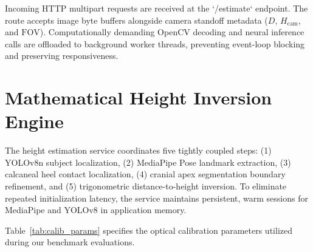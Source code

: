 \documentclass[12pt,a4paper,oneside]{report}
\begin{document}
Incoming HTTP multipart requests are received at the `/estimate` endpoint. The route accepts image byte buffers alongside camera standoff metadata ($D$, $H_{\text{cam}}$, and $\text{FOV}$). Computationally demanding OpenCV decoding and neural inference calls are offloaded to background worker threads, preventing event-loop blocking and preserving responsiveness.

\section{Mathematical Height Inversion Engine}
The height estimation service coordinates five tightly coupled steps: (1) YOLOv8n subject localization, (2) MediaPipe Pose landmark extraction, (3) calcaneal heel contact localization, (4) cranial apex segmentation boundary refinement, and (5) trigonometric distance-to-height inversion. To eliminate repeated initialization latency, the service maintains persistent, warm sessions for MediaPipe and YOLOv8 in application memory.

Table~\ref{tab:calib_params} specifies the optical calibration parameters utilized during our benchmark evaluations.

\begin{table}[H]
\centering
\caption{Camera Calibration Setup and Default Optical Parameters}
\label{tab:calib_params}
\end{table}
\end{document}
